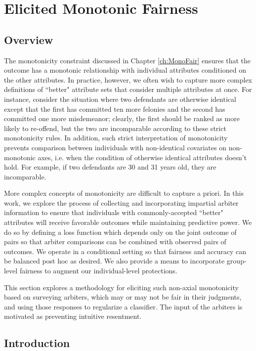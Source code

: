 \chapter{Elicited Monotonic Fairness} \label{ch:SoftMonoFair}
\newcommand{\xc}{c}

\section{Overview}

    The monotonicity constraint discussed in Chapter \ref{ch:MonoFair} ensures that the outcome has a monotonic relationship with individual attributes conditioned on the other attributes.  In practice, however, we often wish to capture more complex definitions of ``better" attribute sets that consider multiple attributes at once.  For instance, consider the situation where two defendants are otherwise identical except that the first has committed ten more felonies and the second has committed one more misdemeanor; clearly, the first should be ranked as more likely to re-offend, but the two are incomparable according to these strict monotonicity rules.  In addition, such strict interpretation of monotonicity prevents comparison between individuals with non-identical covariates on non-monotonic axes, i.e. when the condition of otherwise identical attributes doesn't hold.  For example, if two defendants are 30 and 31 years old, they are incomparable.
    
    More complex concepts of monotonicity are difficult to capture a priori.  In this work, we explore the process of collecting and incorporating impartial arbiter information to ensure that individuals with commonly-accepted ``better" attributes will receive favorable outcomes while maintaining predictive power.  We do so by defining a loss function which depends only on the joint outcome of pairs so that arbiter comparisons can be combined with observed pairs of outcomes.  We operate in a conditional setting so that fairness and accuracy can be balanced post hoc as desired.    We also provide a means to incorporate group-level fairness to augment our individual-level protections.
    
    This section explores a methodology for eliciting such non-axial monotonicity based on surveying arbiters, which may or may not be fair in their judgments, and using those responses to regularize a classifier.  The input of the arbiters is motivated as preventing intuitive resentment. 

\section{Introduction}\label{sec:softmono_bg}
    
